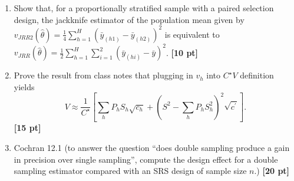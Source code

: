 \documentclass[12pt]{article}
\begin{document}
\begin{enumerate}
	\begin{enumerate}[itemsep=5ex]
	\item Using the data DIOXIN2.DAT, compute $(X^\top W X)^{-1}$  {\bf [10 pt]}
	\item Again using the data DIOXIN2.DAT, compute $\sigma^4 v(U_w ({\bf b_w}))$ where ${\bf b}_w$ is the estimator of the linear regression parameters of $\log (\text{TCDD})$ on age and $U$ is the score function.  {\bf [10 pt]}
	\item Using the results of (a) and (b), compute $v({\bf b}_w)$ and compare the square root of the diagonal elements of $v({\bf b}_w)$ with the results on the slides {\bf [10 pt]}
	\end{enumerate}
\item Show that, for a proportionally stratified sample with a paired selection design, the jackknife estimator of the population mean given by $v_{JRR2} (\hat \theta) = \frac{1}{4} \sum_{h=1}^H ( \bar y_{(h1)} - \bar y_{(h2)})^2$ is equivalent to $v_{JRR} (\hat \theta) = \frac{1}{2} \sum_{h=1}^H \sum_{i=1}^2 \left( \bar y_{(hi)} - \bar y \right)^2$. {\bf [10 pt]}
\item Prove the result from class notes that plugging in $v_h$ into $C^\star V$ definition yields
$$
V \approx \frac{1}{C^\star} \left[ \sum_h P_h S_h \sqrt{c_h} + \left(S^2 - \sum_h P_h S_h^2 \right)^2 \sqrt{c^\prime} \right].
$$
{\bf [15 pt]}
\item Cochran 12.1 (to answer the question ``does double sampling produce a gain in precision over single sampling'', compute the design effect for a double sampling estimator compared with an SRS design of sample size $n$.) {\bf [20 pt]}
\end{enumerate}
\end{document}
